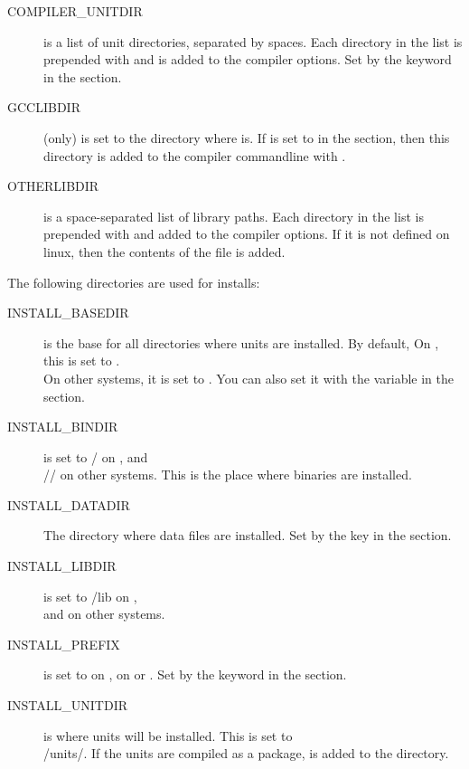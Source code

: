 {\begin{description}
\item[COMPILER\_UNITDIR] is a list of unit directories, separated by spaces.
Each directory in the list is prepended with  and is added to the
compiler options.
Set by the  keyword in the  section.

\item[GCCLIBDIR] (\linux only) is set to the directory where 
is. If  is set to  in the  section, then
this directory is added to the compiler commandline with .

\item[OTHERLIBDIR] is a space-separated list of library paths. Each
directory in the list is prepended with  and added to the 
compiler options.  If it is not defined on linux, then the contents of 
the  file is added.
\end{description}

The following directories are used for installs:
\begin{description}
\item[INSTALL\_BASEDIR] is the base for all directories where units are
installed. By default, On \linux, this is set to 
.\\ On other systems,
it is set to . You can also set it with the
 variable in the  section.

\item[INSTALL\_BINDIR] is set to / on \linux,
and\\ // on other systems.
This is the place where binaries are installed.

\item[INSTALL\_DATADIR] The directory where data files are installed. Set by
the  key in the  section.

\item[INSTALL\_LIBDIR] is set to /lib on \linux,\\
 and  on other systems.

\item[INSTALL\_PREFIX] is set to  on \linux,  on \dos
or \windowsnt. Set by the  keyword in the 
section.

\item[INSTALL\_UNITDIR] is where units will be installed. This is set to\\
/units/. If the units are compiled
as a package,  is added to the directory.
\end{description}

}
